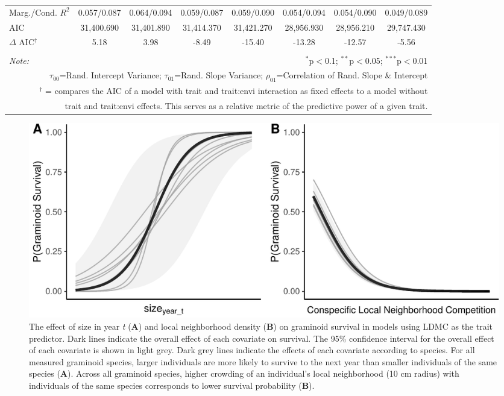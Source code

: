 \documentclass[12pt, letterpaper]{article}
\begin{document}
\begin{table}[h]
{\begin{tabular}{lccccccc}
 Marg./Cond. $R^2$ & 0.057/0.087 &	0.064/0.094&	0.059/0.087	&0.059/0.090&	0.054/0.094	& 0.054/0.090 &	0.049/0.089 \\
\rowcolor[gray]{.95} AIC & 31,400.690 & 31,401.890 & 31,414.370 & 31,421.270 & 28,956.930 & 28,956.210 & 29,747.430  \\  
\hline 
$\Delta$ AIC$^\dagger$  & 5.18 & 3.98 & -8.49 & -15.40 & -13.28 & -12.57 & -5.56 \\
\hline 
\hline \\[-1.8ex] 
\textit{Note:}  & \multicolumn{7}{r}{$^{*}$p$<$0.1; $^{**}$p$<$0.05; $^{***}$p$<$0.01} \\ 
\multicolumn{8}{r}{$\tau_{00}$=Rand. Intercept Variance; $\tau_{01}$=Rand. Slope Variance; $\rho_{01}$=Correlation of Rand. Slope \& Intercept}\\ 
\multicolumn{8}{r}{$^\dagger$ = compares the AIC of a model with trait and trait:envi interaction as fixed effects to a model without}\\
\multicolumn{8}{r}{trait and trait:envi effects. This serves as a relative metric of the predictive power of a given trait.}
\end{tabular}}
\end{table} 

\begin{figure}
    \centering
    \includegraphics[width=.8\textwidth]{figures/survEffectPlots-1.pdf}
    \caption{The effect of size in year \textit{t} (\textbf{A}) and local neighborhood density (\textbf{B}) on graminoid survival in models using LDMC as the trait predictor. Dark lines indicate the overall effect of each covariate on survival. The 95\% confidence interval for the overall effect of each covariate is shown in light grey. Dark grey lines indicate the effects of each covariate according to species. For all measured graminoid species, larger individuals are more likely to survive to the next year than smaller individuals of the same species (\textbf{A}). Across all graminoid species, higher crowding of an individual's local neighborhood (10 cm radius) with individuals of the same species corresponds to lower survival probability (\textbf{B}). }
    \label{fig:Effects_Survival}
\end{figure}
\end{document}
